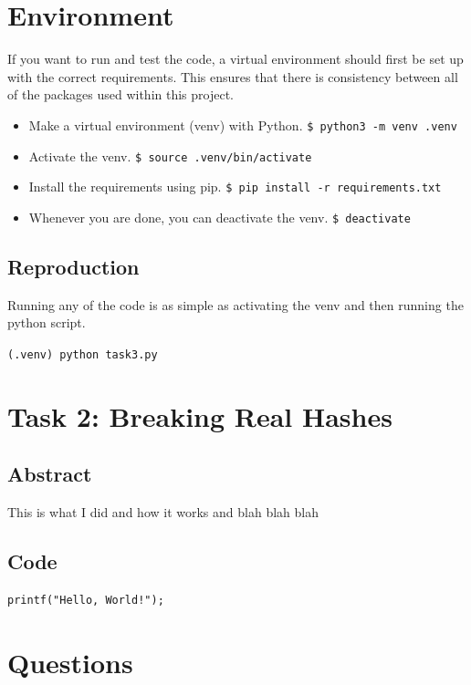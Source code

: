 \documentclass[11pt]{article}
\begin{document}
\section*{Environment}
If you want to run and test the code, a virtual environment should first be set up with the correct requirements. This ensures that there is consistency between all of the packages used within this project.

\begin{itemize}
	\item Make a virtual environment (venv) with Python.
		\verb|$ python3 -m venv .venv|
	\item Activate the venv.
		\verb|$ source .venv/bin/activate|
	\item Install the requirements using pip.
		\verb|$ pip install -r requirements.txt|
	\item Whenever you are done, you can deactivate the venv.
		\verb|$ deactivate|
\end{itemize}

\subsection*{Reproduction}
Running any of the code is as simple as activating the venv and then running the python script.

\verb|(.venv) python task3.py|

\section*{Task 2: Breaking Real Hashes}
\subsection*{Abstract}
This is what I did and how it works and blah blah blah

\subsection*{Code}

\begin{lstlisting}
printf("Hello, World!");
\end{lstlisting}


\section*{Questions}
\end{document}
